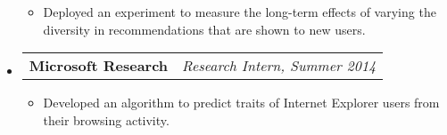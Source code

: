 \documentclass[letterpaper,10pt]{article}
\makeatletter
\newcommand{\resitem}[1]{\item #1 \vspace{-2pt}}
\newcommand{\resheading}[1]{{\large \colorbox{mygrey}{\begin{minipage}{\textwidth}{\textbf{#1 \vphantom{p\^{E}}}}\end{minipage}}}}
\newcommand{\ressubheading}[4]{
\begin{tabular*}{7.0in}{l@{\extracolsep{\fill}}r}
		\textbf{#1} & \textit{#4} \\
\end{tabular*}\vspace{-6pt}}
\makeatother
\begin{document}
\begin{itemize}
\begin{itemize}
\item Deployed an experiment to measure the long-term effects of varying the diversity in recommendations that are shown to new users.
	\end{itemize}
\item
	\ressubheading{Microsoft Research}{Mountain View, CA}{Intern}{Research Intern, Summer 2014}
	\begin{itemize}
		\resitem{Developed an algorithm to predict traits of Internet Explorer users from their browsing activity.}
	\end{itemize}

\end{itemize}

%
%
\end{document}
